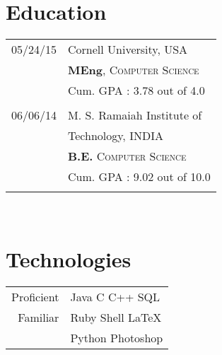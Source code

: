 \documentclass[10pt]{article} %
\begin{document}
{\begin{minipage}[t]{0.4\textwidth}

\section{\textbf{Education}}

\begin{tabular}{rl} %


05/24/15 & \large{Cornell University,} \normalsize{USA}\\
& \textbf{MEng}, \textsc{Computer Science} \\ 
& \small Cum. GPA : 3.78 out of 4.0\\
&\\
	 

06/06/14 & \large{M. S. Ramaiah Institute of} \\
& \large{Technology,} \normalsize{INDIA} \\
&  \textbf{B.E.} \textsc{Computer Science} \\ 
& \small Cum. GPA : 9.02 out of 10.0\\
&\\
\end{tabular}\\[10pt]


\section{\textbf{Technologies}}
\begin{tabular}{rl}
Proficient
& Java \textbullet{} C \textbullet{} C++ \textbullet{} SQL
& \\
Familiar
& Ruby \textbullet{} Shell \textbullet{} \LaTeX \\
& Python \textbullet{} Photoshop\\
\end{tabular}\\


\end{minipage}}
\end{document}
